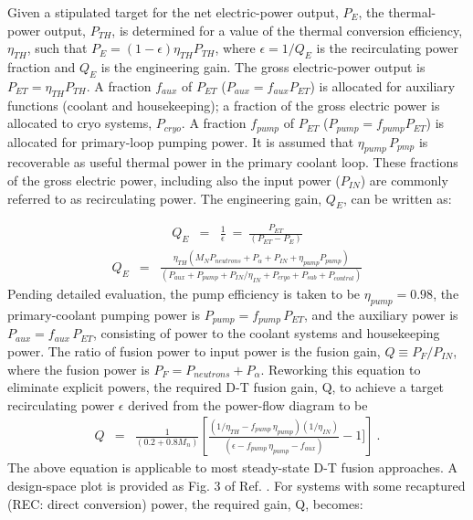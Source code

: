 Given a stipulated target for the net electric-power output, $P_E$, the thermal-power output, $P_{TH}$, is determined for a value of the thermal conversion efficiency, $\eta_{TH}$, such that \hbox{$P_E = (1-\epsilon) \eta_{TH} P_{TH}$}, where \hbox{$\epsilon = 1/Q_E$} is the recirculating power fraction and $Q_E$ is the engineering gain.   The gross electric-power output is \hbox{$P_{ET} =\eta_{TH} P_{TH}$}. A fraction $f_{aux}$ of $P_{ET}$ ($P_{aux} = f_{aux} P_{ET}$) is allocated  for auxiliary functions (coolant and housekeeping); a fraction of the gross electric power is allocated to cryo systems, $P_{cryo}$. A fraction  $f_{pump}$ of $P_{ET}$ (\hbox{$P_{pump} = f_{pump} P_{ET}$}) is allocated for primary-loop pumping power. It is assumed that \hbox{$\eta_{pump}  \, P_{pmp}$} is recoverable as useful thermal power in the primary coolant loop.  These fractions of the gross electric power, including also the input power ($P_{IN}$) are commonly referred to as recirculating power. The engineering gain, $Q_E$, can be written as: 


\begin{eqnarray}
\label{e-2-53}
Q_E & = & \frac{1}{\epsilon} \: = \: \frac{P_{ET}}{(P_{ET} - P_{E})}  
\end{eqnarray}
\begin{eqnarray}
\label{e-2-54}
Q_{E} & = & \frac{\eta_{TH}(M_NP_{neutrons}+P_{\alpha}+P_{IN}+ \eta_{pump}P_{pump})}{(P_{aux} + P_{pump}+P_{IN}/\eta_{IN} + P_{cryo} +P_{sub} + P_{control})} 
 \end{eqnarray}
Pending detailed evaluation, the pump efficiency is taken to be $\eta_{pump} = 0.98$, the primary-coolant pumping power is $P_{pump} = f_{pump} \, P_{ET}$, and the auxiliary power is $P_{aux} = f_{aux} \, P_{ET}$, consisting of power to the coolant systems and housekeeping power.
The ratio of fusion power to input power is the fusion gain, \hbox{$Q \equiv P_{F}/P_{IN}$}, where the fusion power is $P_{F} = P_{neutrons} + P_{\alpha}$. Reworking this equation to eliminate explicit powers, the required D-T fusion gain, Q, to achieve a target recirculating power $\epsilon$ derived from the power-flow diagram to be
\begin{eqnarray}
\label{e-2-54}
Q & = & \frac{1}{(0.2 + 0.8 M_n)}
\left[\frac{(1/\eta_{TH} - f_{pump} \,\eta_{pump})(1/\eta_{IN})}{(\epsilon - f_{pump} \,\eta_{pump} - f_{aux})} - 1]\right] \: .
\end{eqnarray} 
The above equation is applicable to most steady-state D-T fusion approaches.  A design-space plot is provided as Fig. 3 of Ref. \cite{Miller2007}. For systems with some recaptured (REC: direct conversion) power, the required gain, Q, becomes: 



